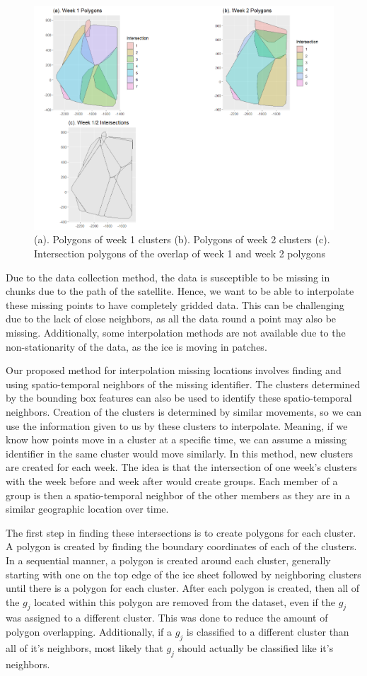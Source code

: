 \documentclass[12pt]{article}
\begin{document}
\begin{figure}[tbp]

{\centering \includegraphics[width=0.7\linewidth,]{images/int-one} 

}

\caption{(a). Polygons of week 1 clusters (b). Polygons of week 2 clusters (c). Intersection polygons of the overlap of week 1 and week 2 polygons}\label{fig:int-plot}
\end{figure}

Due to the data collection method, the data is susceptible to be missing
in chunks due to the path of the satellite. Hence, we want to be able to
interpolate these missing points to have completely gridded data. This
can be challenging due to the lack of close neighbors, as all the data
round a point may also be missing. Additionally, some interpolation
methods are not available due to the non-stationarity of the data, as
the ice is moving in patches.

Our proposed method for interpolation missing locations involves finding
and using spatio-temporal neighbors of the missing identifier. The
clusters determined by the bounding box features can also be used to
identify these spatio-temporal neighbors. Creation of the clusters is
determined by similar movements, so we can use the information given to
us by these clusters to interpolate. Meaning, if we know how points move
in a cluster at a specific time, we can assume a missing identifier in
the same cluster would move similarly. In this method, new clusters are
created for each week. The idea is that the intersection of one week's
clusters with the week before and week after would create groups. Each
member of a group is then a spatio-temporal neighbor of the other
members as they are in a similar geographic location over time.

The first step in finding these intersections is to create polygons for
each cluster. A polygon is created by finding the boundary coordinates
of each of the clusters. In a sequential manner, a polygon is created
around each cluster, generally starting with one on the top edge of the
ice sheet followed by neighboring clusters until there is a polygon for
each cluster. After each polygon is created, then all of the \(g_j\)
located within this polygon are removed from the dataset, even if the
\(g_j\) was assigned to a different cluster. This was done to reduce the
amount of polygon overlapping. Additionally, if a \(g_j\) is classified
to a different cluster than all of it's neighbors, most likely that
\(g_j\) should actually be classified like it's neighbors.
\end{document}
